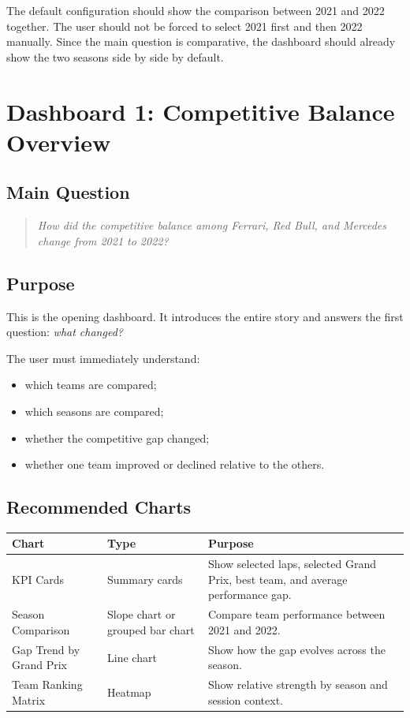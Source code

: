 \documentclass[12pt,a4paper]{article}
\begin{document}
	The default configuration should show the comparison between 2021 and 2022 together.
	The user should not be forced to select 2021 first and then 2022 manually.
	Since the main question is comparative, the dashboard should already show the two seasons side by side by default.
	
	\section{Dashboard 1: Competitive Balance Overview}
	
	\subsection{Main Question}
	
	\begin{quote}
		\textit{How did the competitive balance among Ferrari, Red Bull, and Mercedes change from 2021 to 2022?}
	\end{quote}
	
	\subsection{Purpose}
	
	This is the opening dashboard.
	It introduces the entire story and answers the first question: \textit{what changed?}
	
	The user must immediately understand:
	
	\begin{itemize}[leftmargin=1.2cm]
		\item which teams are compared;
		\item which seasons are compared;
		\item whether the competitive gap changed;
		\item whether one team improved or declined relative to the others.
	\end{itemize}
	
	\subsection{Recommended Charts}
	
	\begin{longtable}{p{4cm} p{4cm} p{6cm}}
		\toprule
		\textbf{Chart} & \textbf{Type} & \textbf{Purpose} \\
		\midrule
		KPI Cards & Summary cards & Show selected laps, selected Grand Prix, best team, and average performance gap. \\
		Season Comparison & Slope chart or grouped bar chart & Compare team performance between 2021 and 2022. \\
		Gap Trend by Grand Prix & Line chart & Show how the gap evolves across the season. \\
		Team Ranking Matrix & Heatmap & Show relative strength by season and session context. \\
		\bottomrule
	\end{longtable}
	
\end{document}
